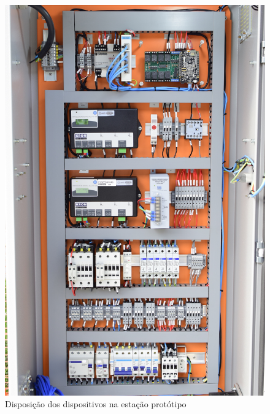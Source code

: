 \begin{figure}[H]
        \begin{center}
                \includegraphics[width=\textwidth,natwidth=1420,natheight=2130]{assets/images/evse-setup.jpg}
                \caption{Disposição dos dispositivos na estação protótipo}
                \label{fig:evse-setup}
        \end{center}
\end{figure}
